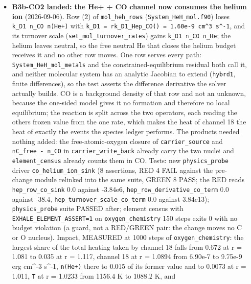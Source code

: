 \documentclass[english,a4paper]{my_memo}
\begin{document}
\begin{itemize}
  and that leaves the oxygen case without an end-to-end gate for its CO
  source; \texttt{heat\_channel\_state} now has 19 columns (checkpointed by
  B3c-COST); \texttt{python/paper\_data.py} \texttt{HEAT\_FIXED} stale.
\item
  \textbf{B3b-CO2 landed: the He+ + CO channel now consumes the helium ion}
  (2026-09-06). Row (2) of \texttt{mol\_heh\_rows} (\texttt{System\_HeH\_mol.f90}) loses
  \texttt{k\_D1\ n\_CO\ n(He+)} with \texttt{k\_D1\ =\ rk\_D1\_Hep\_CO()\ =\ 1.60e-9\ cm\^{}3\ s\^{}-1}, and
  its turnover scale (\texttt{set\_mol\_turnover\_rates}) gains \texttt{k\_D1\ n\_CO\ n\_He}; the
  helium leaves neutral, so the free neutral He that closes the helium budget
  receives it and no other row moves. One row serves every path:
  \texttt{System\_HeH\_mol\_metals} and the constrained-equilibrium residual both call
  it, and neither molecular system has an analytic Jacobian to extend
  (\texttt{hybrd1}, finite differences), so the test asserts the difference
  derivative the solver actually builds. CO is a background density of that
  row and not an unknown, because the one-sided model gives it no formation
  and therefore no local equilibrium; the reaction is split across the two
  operators, each reading the other\textquotesingle s frozen value from the one rate, which
  makes the heat of channel 18 the heat of exactly the events the species
  ledger performs. The products needed nothing added: the free-atomic-oxygen
  closure of \texttt{carrier\_source} and \texttt{nC\_free\ -\ n\_CO} in \texttt{carrier\_write\_back}
  already carry the two nuclei and \texttt{element\_census} already counts them in
  CO. Tests: new \texttt{physics\_probe} driver \texttt{co\_helium\_ion\_sink} (8 assertions,
  RED 4 FAIL against the pre-change module relinked into the same suite,
  GREEN 8 PASS; the RED reads \texttt{hep\_row\_co\_sink} 0.0 against -3.84e6,
  \texttt{hep\_row\_derivative\_co\_term} 0.0 against -38.4, \texttt{hep\_turnover\_scale\_co\_term}
  0.0 against 3.84e13); \texttt{physics\_probe} suite PASSED after; element census
  with \texttt{EXHALE\_ELEMENT\_ASSERT=1} on \texttt{oxygen\_chemistry} 150 steps exits 0 with
  no budget violation (a guard, not a RED/GREEN pair: the change moves no C
  or O nucleus). Impact, MEASURED at 1000 steps of \texttt{oxygen\_chemistry}: the
  largest share of the total heating taken by channel 18 falls from 0.672 at
  r = 1.081 to 0.035 at r = 1.117, channel 18 at r = 1.0894 from 6.90e-7 to
  9.75e-9 erg cm\^{}-3 s\^{}-1, \texttt{n(He+)} there to 0.015 of its former value and to
  0.0073 at r = 1.011, \texttt{T} at r = 1.0233 from 1156.4 K to 1088.2 K, and

\end{itemize}
\end{document}
